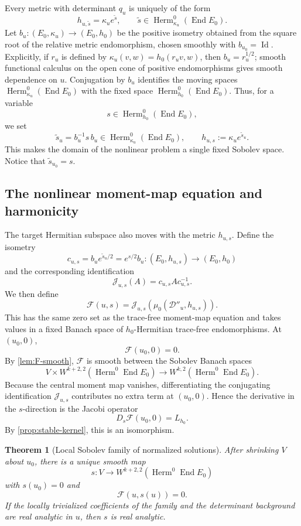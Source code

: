 \documentclass[11pt,reqno]{amsart}
\newtheorem{theorem}{Theorem}[section]
\theoremstyle{definition}
\theoremstyle{remark}
\newcommand{\cD}{\mathcal D}
\newcommand{\cF}{\mathcal F}
\newcommand{\End}{\operatorname{End}}
\newcommand{\Herm}{\operatorname{Herm}}
\newcommand{\Id}{\operatorname{Id}}
\begin{document}
Every metric with determinant $q_u$ is uniquely of the form
\[
  h_{u,\widetilde s}=\kappa_ue^{\widetilde s},
  \qquad \widetilde s\in\Herm^0_{\kappa_u}(\End E_0).
\]
Let $b_u:(E_0,\kappa_u)\to(E_0,h_0)$ be the positive isometry obtained
from the square root of the relative metric endomorphism, chosen
smoothly with $b_{u_0}=\Id$.  Explicitly, if $r_u$ is defined by
$\kappa_u(v,w)=h_0(r_uv,w)$, then $b_u=r_u^{1/2}$; smooth functional
calculus on the open cone of positive endomorphisms gives smooth
dependence on $u$.  Conjugation by $b_u$ identifies the moving spaces
$\Herm^0_{\kappa_u}(\End E_0)$ with the fixed space
$\Herm^0_{h_0}(\End E_0)$.  Thus, for a variable
\[
  s\in\Herm^0_{h_0}(\End E_0),
\]
we set
\begin{equation}\label{eq:transported-s}
  \widetilde s_u=b_u^{-1}s\,b_u
  \in\Herm^0_{\kappa_u}(\End E_0),
  \qquad
  h_{u,s}:=\kappa_u e^{\widetilde s_u}.
\end{equation}
This makes the domain of the nonlinear problem a single fixed Sobolev space.  Notice that $\widetilde s_{u_0}=s$.

\subsection{The nonlinear moment-map equation and harmonicity}

The target Hermitian subspace also moves with the metric $h_{u,s}$.  Define the isometry
\[
  c_{u,s}=b_u e^{\widetilde s_u/2}
  =e^{s/2}b_u:
  (E_0,h_{u,s})\longrightarrow(E_0,h_0)
\]
and the corresponding identification
\[
  \mathcal J_{u,s}(A)=c_{u,s}Ac_{u,s}^{-1}.
\]
We then define
\begin{equation}\label{eq:stable-F}
  \cF(u,s)
  =\mathcal J_{u,s}\!\left(
  \mu_0(\cD''_u,h_{u,s})
  \right).
\end{equation}
This has the same zero set as the trace-free moment-map equation and takes values in a fixed Banach space of $h_0$-Hermitian trace-free endomorphisms.
At $(u_0,0)$,
\[
  \cF(u_0,0)=0.
\]
By \cref{lem:F-smooth}, $\cF$ is smooth between the Sobolev Banach spaces
\[
  V\times W^{k+2,2}(\Herm^0\End E_0)
  \longrightarrow
  W^{k,2}(\Herm^0\End E_0).
\]
Because the central moment map vanishes, differentiating the conjugating identification $\mathcal J_{u,s}$ contributes no extra term at $(u_0,0)$.  Hence the derivative in the $s$-direction is the Jacobi operator
\[
  D_s\cF(u_0,0)=L_{h_0}.
\]
By \cref{prop:stable-kernel}, this is an isomorphism.

\begin{theorem}[Local Sobolev family of normalized solutions]\label{thm:sobolev-family}
After shrinking $V$ about $u_0$, there is a unique smooth map
\[
  s:V\to W^{k+2,2}(\Herm^0\End E_0)
\]
with $s(u_0)=0$ and
\[
  \cF(u,s(u))=0.
\]
If the locally trivialized coefficients of the family and the determinant background are real analytic in $u$, then $s$ is real analytic.
\end{theorem}
\end{document}
